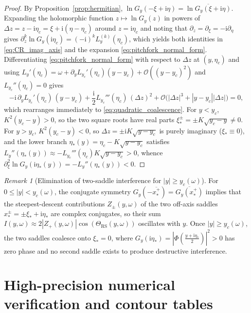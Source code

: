 \documentclass[11pt,a4paper,reqno]{amsart}
\theoremstyle{definition}
\theoremstyle{remark}
\newtheorem{remark}[theorem]{Remark}
\numberwithin{equation}{section}
\newcommand{\ii}{\mathrm{i}}
\begin{document}
\begin{proof}
By Proposition~\ref{prop:hermitian}, $\ln G_y(-\xi+\ii\eta) = \overline{\ln G_y(\xi+\ii\eta)}$. Expanding the holomorphic function $z \mapsto \ln G_y(z)$ in powers of $\Delta z = z - \ii\eta_c = \xi + \ii(\eta - \eta_c)$ around $z = \ii\eta_c$ and noting that $\partial_z = \partial_\xi = -\ii\partial_\eta$ gives $\partial_z^k \ln G_y(\ii\eta_c) = (-\ii)^k L_y^{(k)}(\eta_c)$, which yields both identities in \eqref{eq:CR_imag_axis} and the expansion \eqref{eq:pitchfork_normal_form}. Differentiating \eqref{eq:pitchfork_normal_form} with respect to $\Delta z$ at $(y,\eta_c)$ and using $L_y'(\eta_c) = \omega + \partial_y L_{y_c}'(\eta_c)(y - y_c) + \mathcal{O}((y-y_c)^2)$ and $L_{y_c}''(\eta_c) = 0$ gives
\[
-\ii\,\partial_y L_{y_c}'(\eta_c)\,(y - y_c) + \frac{\ii}{2}L_{y_c}'''(\eta_c)\,(\Delta z)^2 + \mathcal{O}\big(|\Delta z|^3 + |y - y_c||\Delta z|\big) = 0,
\]
which rearranges immediately to \eqref{eq:quadratic_coalescence}. For $y < y_c$, $K^2(y_c - y) > 0$, so the two square roots have real parts $\xi_*^\pm = \pm K\sqrt{y_c - y} \neq 0$. For $y > y_c$, $K^2(y_c - y) < 0$, so $\Delta z = \pm\ii K\sqrt{y - y_c}$ is purely imaginary ($\xi_* \equiv 0$), and the lower branch $\eta_*(y) = \eta_c - K\sqrt{y - y_c}$ satisfies $L_y''(\eta_*(y)) \approx -L_{y_c}'''(\eta_c) K\sqrt{y - y_c} > 0$, whence $\partial_\xi^2\ln G_y(\ii\eta_*(y)) = -L_y''(\eta_*(y)) < 0$.
\end{proof}

\begin{remark}[Elimination of two-saddle interference for $|y| \ge y_c(\omega)$]\label{rem:interference}
For $0 \le |y| < y_c(\omega)$, the conjugate symmetry $G_y(-\overline{x_*^+}) = \overline{G_y(x_*^+)}$ implies that the steepest-descent contributions $Z_\pm(y,\omega)$ of the two off-axis saddles $x_*^\pm = \pm\xi_* + \ii\eta_*$ are complex conjugates, so their sum $I(y,\omega) \approx 2|Z_+(y,\omega)|\cos(\Theta_{\mathrm{RS}}(y,\omega))$ oscillates with $y$. Once $|y| \ge y_c(\omega)$, the two saddles coalesce onto $\xi_* = 0$, where $G_y(\ii\eta_*) = |\Phi(\frac{y+\ii\eta_*}{2})|^2 > 0$ has zero phase and no second saddle exists to produce destructive interference.
\end{remark}

\section{High-precision numerical verification and contour tables}\label{sec:numerics}
\end{document}
